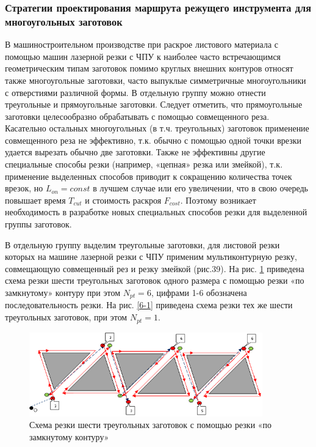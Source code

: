 \documentclass{article}
\begin{document}
\subsubsection{Стратегии проектирования маршрута режущего инструмента для многоугольных заготовок}

В машиностроительном производстве
при раскрое листового материала с помощью машин лазерной резки с ЧПУ
к наиболее часто встречающимся геометрическим
типам заготовок помимо круглых внешних контуров
относят также многоугольные заготовки,
часто выпуклые симметричные многоугольники с отверстиями различной формы.
В отдельную группу можно отнести треугольные и прямоугольные заготовки.
Следует отметить, что прямоугольные заготовки целесообразно обрабатывать
с помощью совмещенного реза.
Касательно остальных многоугольных (в т.ч. треугольных)
заготовок применение совмещенного реза не эффективно,
т.к. обычно с помощью одной точки врезки удается вырезать обычно две заготовки.
Также не эффективны другие специальные способы резки
(например, «цепная» резка или змейкой),
т.к. применение выделенных способов приводит к
сокращению количества точек врезок,
но
$L_{on}=const$
в лучшем случае или его увеличении,
что в свою очередь повышает время
$T_{cut}$
и стоимость раскроя
$F_{cost}$.
Поэтому возникает необходимость в разработке
новых специальных способов резки для выделенной группы заготовок.

В отдельную группу выделим треугольные заготовки,
для листовой резки которых на машине лазерной резки с ЧПУ
применим мультиконтурную резку,
совмещающую совмещенный рез и резку змейкой (рис.39).
На рис. \ref{6-6} приведена схема резки шести треугольных заготовок
одного размера с помощью резки «по замкнутому» контуру при этом
$N_{pt}=6$,
цифрами 1-6 обозначена последовательность резки.
На рис. \ref{6-1} приведена схема резки тех же шести
треугольных заготовок, при этом
$N_{pt}=1$.

\begin{figure}
  \begin{center}
  \includegraphics[width=0.9\textwidth]{6-6.png}
  \caption{Схема резки шести треугольных заготовок с помощью резки «по замкнутому контуру»}
  \label{6-6}
  \end{center}
\end{figure}
\end{document}
